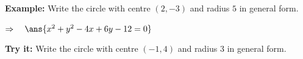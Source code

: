 \documentclass[12pt]{article}
\begin{document}
\begin{examplebox}
\textbf{Example:} \quad Write the circle with centre $(2,-3)$ and radius $5$ in general form.

$\Rightarrow\quad \ans{x^2 + y^2 - 4x + 6y - 12 = 0}$
\end{examplebox}

\begin{tryitbox}
\textbf{Try it:} \quad Write the circle with centre $(-1, 4)$ and radius $3$ in general form.\\[2pt]
\end{tryitbox}
\end{document}
